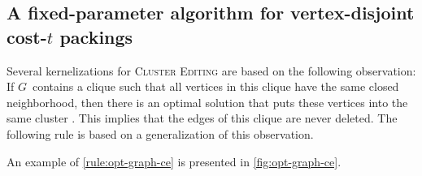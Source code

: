 \documentclass[envcountsame,numbook,smallextended]{svjour3}
\numberwithin{equation}{section}
\numberwithin{figure}{section}
\newcommand{\symdiff}{\triangle}
\newcommand{\packing}{\ensuremath{\mathcal H}}
\begin{document}
\subsection{A fixed-parameter algorithm for vertex-disjoint cost-\(t\) packings}
\label{sec:cet}
Several kernelizations for \textsc{Cluster Editing}
are based on the following observation:
If $G$~contains a clique
such that all vertices in this clique
have the same closed neighborhood,
then there is an optimal solution that
puts these vertices into the same cluster
\cite{PSS09,Guo09,CM12}.
This implies that the edges of this clique
are never deleted.
The following rule
is based on a generalization of this observation.
An example of \cref{rule:opt-graph-ce} is presented
in \cref{fig:opt-graph-ce}.
\end{document}
